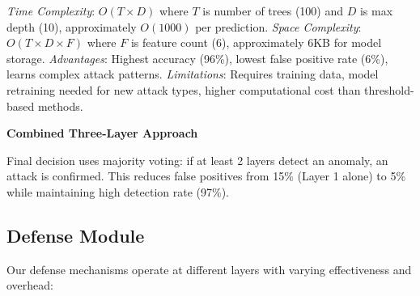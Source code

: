 \documentclass[conference]{IEEEtran}
\begin{document}
\textit{Time Complexity}: $O(T \times D)$ where $T$ is number of trees (100) and $D$ is max depth (10), approximately $O(1000)$ per prediction. \textit{Space Complexity}: $O(T \times D \times F)$ where $F$ is feature count (6), approximately 6KB for model storage. \textit{Advantages}: Highest accuracy (96\%), lowest false positive rate (6\%), learns complex attack patterns. \textit{Limitations}: Requires training data, model retraining needed for new attack types, higher computational cost than threshold-based methods.

\textbf{Combined Three-Layer Approach}

Final decision uses majority voting: if at least 2 layers detect an anomaly, an attack is confirmed. This reduces false positives from 15\% (Layer 1 alone) to 5\% while maintaining high detection rate (97\%).

\subsection{Defense Module}

Our defense mechanisms operate at different layers with varying effectiveness and overhead:
\end{document}
